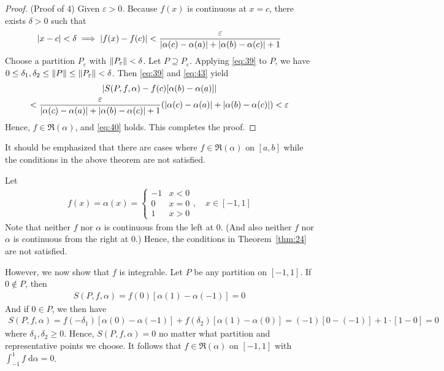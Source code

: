 \documentclass[thmcnt=section, 12pt]{my-elegantbook}
\begin{document}
\begin{proof}
    \par (Proof of 4) Given $\varepsilon > 0$. Because $f(x)$ is continuous at $x=c$, there exists $\delta > 0$ such that
    \begin{align}
        \left\lvert x - c \right\rvert < \delta
        \implies \left\lvert f(x) - f(c) \right\rvert < \frac{\varepsilon}{\left\lvert \alpha(c) - \alpha(a) \right\rvert + \left\lvert \alpha(b) - \alpha(c) \right\rvert + 1}
        \label{eq:43}
    \end{align}
    Choose a partition $P_\varepsilon$ with $\left\lVert P_\varepsilon \right\rVert < \delta$. Let $P \supseteq P_\varepsilon$. Applying \eqref{eq:39} to $P$, we have $0 \leq \delta_1, \delta_2 \leq \left\lVert P \right\rVert \leq \left\lVert P_\varepsilon \right\rVert < \delta$. Then \eqref{eq:39} and \eqref{eq:43} yield
    \begin{multline*}
        \left\lvert 
            S(P,f,\alpha)
            - f(c) [\alpha(b) - \alpha(a)]
         \right\rvert \\
        <   \frac{\varepsilon}{\left\lvert \alpha(c) - \alpha(a) \right\rvert + \left\lvert \alpha(b) - \alpha(c) \right\rvert + 1} (\left\lvert \alpha(c) - \alpha(a) \right\rvert
        + \left\lvert \alpha(b) - \alpha(c) \right\rvert)
        < \varepsilon
    \end{multline*}
    Hence, $f \in \mathfrak{R}(\alpha)$, and \eqref{eq:40} holds. This completes the proof.
\end{proof}

It should be emphasized that there are cases where $f \in \mathfrak{R}(\alpha)$ on $[a, b]$ while the conditions in the above theorem are not satisfied.

\begin{example}
    Let
    \begin{align*}
        f(x) = \alpha(x) = \begin{cases}
                               -1 & x < 0 \\
                               0  & x=0   \\
                               1  & x > 0
                           \end{cases},
        \quad x \in [-1, 1]
    \end{align*}
    Note that neither $f$ nor $\alpha$ is continuous from the left at $0$. (And also neither $f$ nor $\alpha$ is continuous from the right at $0$.) Hence, the conditions in Theorem~\ref{thm:24} are not satisfied.

    However, we now show that $f$ is integrable. Let $P$ be any partition on $[-1, 1]$. If $0 \notin P$, then
    \begin{align*}
        S(P,f,\alpha) = f(0)[\alpha(1) - \alpha(-1)] = 0
    \end{align*}
    And if $0 \in P$, we then have
    \begin{align*}
        S(P,f,\alpha) = f(-\delta_1)[\alpha(0) - \alpha(-1)] + f(\delta_2)[\alpha(1) - \alpha(0)]
        = (-1)[0-(-1)] + 1 \cdot [1 - 0]
        = 0
    \end{align*}
    where $\delta_1, \delta_2 \geq 0$. Hence, $S(P,f,\alpha) = 0$ no matter what partition and representative points we choose. It follows that $f \in \mathfrak{R}(\alpha)$ on $[-1, 1]$ with $\int_{-1}^{1} f \; \mathrm{d}\alpha = 0$.
\end{example}
\end{document}
